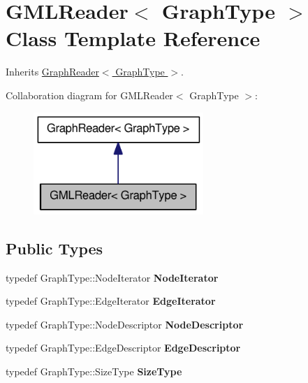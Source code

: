 \hypertarget{class_g_m_l_reader}{
\section{GMLReader$<$ GraphType $>$ Class Template Reference}
\label{class_g_m_l_reader}
}


Inherits \hyperlink{class_graph_reader}{GraphReader$<$ GraphType $>$}.



Collaboration diagram for GMLReader$<$ GraphType $>$:\nopagebreak
\begin{figure}[H]
\begin{center}
\leavevmode
\includegraphics[width=182pt]{class_g_m_l_reader__coll__graph}
\end{center}
\end{figure}
\subsection*{Public Types}
\begin{DoxyCompactItemize}
\item 
\hypertarget{class_g_m_l_reader_a15ddce99669b554ed4d917d70d8d61a2}{
typedef GraphType::NodeIterator {\bfseries NodeIterator}}
\label{class_g_m_l_reader_a15ddce99669b554ed4d917d70d8d61a2}

\item 
\hypertarget{class_g_m_l_reader_a33dd26500e9c4ee899c05fc91a688336}{
typedef GraphType::EdgeIterator {\bfseries EdgeIterator}}
\label{class_g_m_l_reader_a33dd26500e9c4ee899c05fc91a688336}

\item 
\hypertarget{class_g_m_l_reader_af9bc6e03f62a312b815d4277841715fd}{
typedef GraphType::NodeDescriptor {\bfseries NodeDescriptor}}
\label{class_g_m_l_reader_af9bc6e03f62a312b815d4277841715fd}

\item 
\hypertarget{class_g_m_l_reader_ab4eb4c95248b4387896f3d0d9f6e1d4f}{
typedef GraphType::EdgeDescriptor {\bfseries EdgeDescriptor}}
\label{class_g_m_l_reader_ab4eb4c95248b4387896f3d0d9f6e1d4f}

\item 
\hypertarget{class_g_m_l_reader_a9a1f885d1d51d3f1e9a9730d1c9593ba}{
typedef GraphType::SizeType {\bfseries SizeType}}
\label{class_g_m_l_reader_a9a1f885d1d51d3f1e9a9730d1c9593ba}

\end{DoxyCompactItemize}
